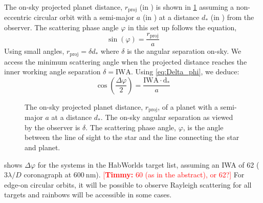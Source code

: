 \documentclass[
    usenatbib,
]{mnras}
\newcommand{\timmy}[1]{\textcolor{red}{[\textbf{Timmy:} #1]}} %
\newcommand{\hwo}{HabWorlds}
\begin{document}
%

The on-sky projected planet distance, $r_\mathrm{proj}$ (in \si{\au}) is shown in \cref{fig:scattering-angle} assuming a non-eccentric circular orbit with a semi-major $a$ (in \si{\au}) at a distance $d_*$ (in \si{\parsec}) from the observer. 
%
The scattering phase angle $\varphi$ in this set up follows the equation,
\begin{equation}
    \sin(\varphi) = \frac{r_\mathrm{proj}}{a}
\end{equation}
%
Using small angles, $r_\mathrm{proj} = \delta d_*$ where $\delta$ is the angular separation on-sky.
%
We access the minimum scattering angle when the projected distance reaches the inner working angle separation $\delta = \mathrm{IWA}$. 
%
Using \cref{eq:Delta_phi}, we deduce:
%
\begin{equation}
    \label{eq:scattering_angle}
    \cos\left(\dfrac{\Delta \varphi}{2}\right) = \frac{\mathrm{IWA \cdot d_*}}{a}
\end{equation}
\begin{figure}
    \centering
    
    \caption{
        The on-sky projected planet distance, $r_\mathrm{proj}$, of a planet with a semi-major $a$ at a distance $d_*$.
        The on-sky angular separation as viewed by the observer is $\delta$.
        The scattering phase angle, $\varphi$, is the angle between the line of sight to the star and the line connecting the star and planet.  
    }
    \label{fig:scattering-angle}
\end{figure}

 shows $\Delta \varphi$ for the systems in the \hwo{} target list, assuming an IWA of \SI{62}{\mas} ($3 \lambda / D$ coronagraph at $\SI{600}{\nano\meter}$). 
\timmy{60 (as in the abstract), or 62?}
%
%
For edge-on circular orbits, it will be possible to observe Rayleigh scattering for all targets and rainbows will be accessible in some cases.
\end{document}

